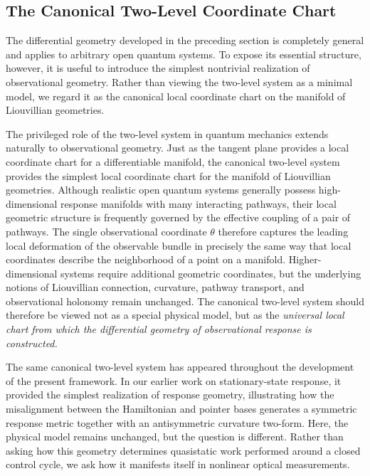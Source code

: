 


\subsection{The Canonical Two-Level Coordinate Chart}
\label{subsec:canonical2LS}
The differential geometry developed in the preceding section is
completely general and applies to arbitrary open quantum systems.
To expose its essential structure, however, it is useful to
introduce the simplest nontrivial realization of observational
geometry. Rather than viewing the two-level system as a minimal
model, we regard it as the canonical local coordinate chart on
the manifold of Liouvillian geometries.

The privileged role of the two-level system in quantum mechanics
extends naturally to observational geometry. Just as the tangent
plane provides a local coordinate chart for a differentiable
manifold, the canonical two-level system provides the simplest
local coordinate chart for the manifold of Liouvillian
geometries. Although realistic open quantum systems generally
possess high-dimensional response manifolds with many interacting
pathways, their local geometric structure is frequently governed
by the effective coupling of a pair of pathways. The single
observational coordinate $\theta$ therefore captures the leading
local deformation of the observable bundle in precisely the same
way that local coordinates describe the neighborhood of a point
on a manifold. Higher-dimensional systems require additional
geometric coordinates, but the underlying notions of Liouvillian
connection, curvature, pathway transport, and observational
holonomy remain unchanged. The canonical two-level system should
therefore be viewed not as a special physical model, but as the
\textit{universal local chart from which the differential geometry of
observational response is constructed.}

The same canonical two-level system has appeared throughout the
development of the present framework. In our earlier work on
stationary-state response, it provided the simplest realization
of response geometry, illustrating how the misalignment between
the Hamiltonian and pointer bases generates a symmetric response
metric together with an antisymmetric curvature two-form. Here,
the physical model remains unchanged, but the question is
different. Rather than asking how this geometry determines
quasistatic work performed around a closed control cycle, we ask
how it manifests itself in nonlinear optical measurements.

